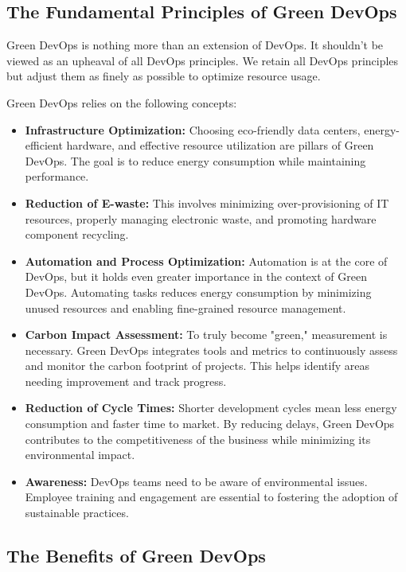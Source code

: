 \subsection*{The Fundamental Principles of Green DevOps}
Green DevOps is nothing more than an extension of DevOps. It shouldn't be viewed as an upheaval of all DevOps principles. We retain all DevOps principles but adjust them as finely as possible to optimize resource usage.

Green DevOps relies on the following concepts:
\begin{itemize}
  \item \textbf{Infrastructure Optimization:} Choosing eco-friendly data centers, energy-efficient hardware, and effective resource utilization are pillars of Green DevOps. The goal is to reduce energy consumption while maintaining performance.
  
  \item \textbf{Reduction of E-waste:} This involves minimizing over-provisioning of IT resources, properly managing electronic waste, and promoting hardware component recycling.
  
  \item \textbf{Automation and Process Optimization:} Automation is at the core of DevOps, but it holds even greater importance in the context of Green DevOps. Automating tasks reduces energy consumption by minimizing unused resources and enabling fine-grained resource management.
  
  \item \textbf{Carbon Impact Assessment:} To truly become "green," measurement is necessary. Green DevOps integrates tools and metrics to continuously assess and monitor the carbon footprint of projects. This helps identify areas needing improvement and track progress.
  
  \item \textbf{Reduction of Cycle Times:} Shorter development cycles mean less energy consumption and faster time to market. By reducing delays, Green DevOps contributes to the competitiveness of the business while minimizing its environmental impact.
  
  \item \textbf{Awareness:} DevOps teams need to be aware of environmental issues. Employee training and engagement are essential to fostering the adoption of sustainable practices.
\end{itemize}

\subsection*{The Benefits of Green DevOps}

